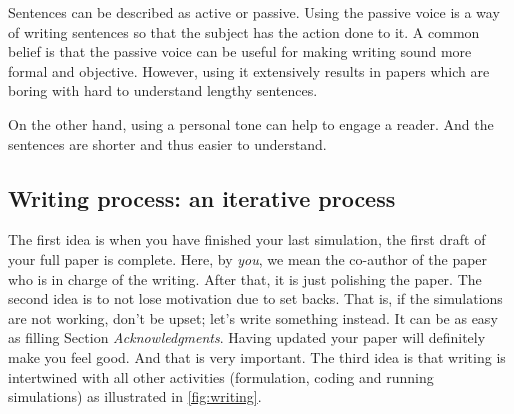 \documentclass[authoryear,3p,times,preprint,review,fleqn]{elsarticle}
\numberwithin{equation}{section}
\theoremstyle{remark}
\begin{document}
Sentences can be described as active or passive. Using the passive voice is a way of writing sentences so that the subject has the action done to it. A common belief is that the passive voice can be useful for making writing sound more formal and objective. However, using it extensively results in papers which are boring with hard to understand lengthy sentences.

On the other hand, using a personal tone can help to engage a reader. And the sentences are shorter and thus easier to understand. 


\subsection{Writing process: an iterative process}\label{sec:writing-process}

The first idea is when you have finished your last simulation, the first draft of your full paper is complete. Here, by \textit{you}, we mean the co-author of the paper who is in charge of the writing. After that, it is just polishing the paper. The second idea is to not lose motivation due to set backs. That is, if the simulations are not working, don't be upset; let's write something instead. It can be as easy as filling Section \textit{Acknowledgments}. Having updated your paper will definitely make you feel good. And that is very important. The third idea is that writing is intertwined with all other activities (formulation, coding and running simulations) as illustrated in \cref{fig:writing}.
\end{document}
